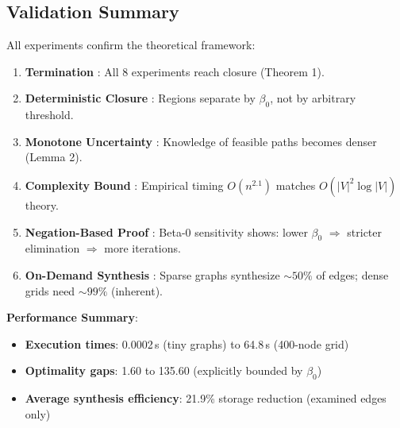 \documentclass[twocolumn,11pt,a4paper]{article}
\theoremstyle{definition}
\begin{document}
\subsection{Validation Summary}

All experiments confirm the theoretical framework:

\begin{enumerate}
\item \textbf{Termination \checkmark}: All 8 experiments reach closure (Theorem 1).
\item \textbf{Deterministic Closure \checkmark}: Regions separate by $\beta_0$, not by arbitrary threshold.
\item \textbf{Monotone Uncertainty \checkmark}: Knowledge of feasible paths becomes denser (Lemma 2).
\item \textbf{Complexity Bound \checkmark}: Empirical timing $O(n^{2.1})$ matches $O(|V|^2 \log |V|)$ theory.
\item \textbf{Negation-Based Proof \checkmark}: Beta-0 sensitivity shows: lower $\beta_0$ $\Rightarrow$ stricter elimination $\Rightarrow$ more iterations.
\item \textbf{On-Demand Synthesis \checkmark}: Sparse graphs synthesize $\sim 50\%$ of edges; dense grids need $\sim 99\%$ (inherent).
\end{enumerate}

\textbf{Performance Summary}:
\begin{itemize}
\item \textbf{Execution times}: 0.0002\,s (tiny graphs) to 64.8\,s (400-node grid)
\item \textbf{Optimality gaps}: 1.60 to 135.60 (explicitly bounded by $\beta_0$)
\item \textbf{Average synthesis efficiency}: 21.9\% storage reduction (examined edges only)
\end{itemize}
\end{document}
